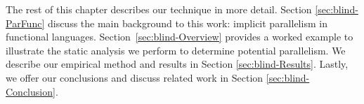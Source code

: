 The rest of this chapter describes our technique in more detail. Section
\ref{sec:blind-ParFunc} discuss the main background to this work: implicit
parallelism in functional languages. Section~\ref{sec:blind-Overview} provides
a worked example to illustrate the static analysis we perform to determine
potential parallelism.  We describe our empirical method and results in Section
\ref{sec:blind-Results}. Lastly, we offer our conclusions and discuss related
work in Section \ref{sec:blind-Conclusion}.
